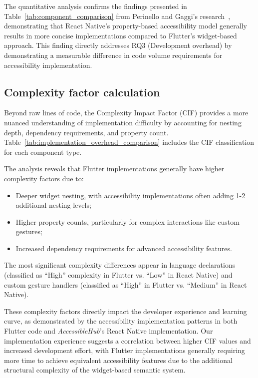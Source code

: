 {The quantitative analysis confirms the findings presented in Table~\ref{tab:component_comparison} from Perinello and Gaggi's research~\cite{perinello2024accessibility}, demonstrating that React Native's property-based accessibility model generally results in more concise implementations compared to Flutter's widget-based approach. This finding directly addresses RQ3 (Development overhead) by demonstrating a measurable difference in code volume requirements for accessibility implementation.

\subsection{Complexity factor calculation}
\label{subsec:complexity-calculation}

Beyond raw lines of code, the Complexity Impact Factor (CIF) provides a more nuanced understanding of implementation difficulty by accounting for nesting depth, dependency requirements, and property count. Table~\ref{tab:implementation_overhead_comparison} includes the CIF classification for each component type.

The analysis reveals that Flutter implementations generally have higher complexity factors due to:

\begin{itemize}
    \item Deeper widget nesting, with accessibility implementations often adding 1-2 additional nesting levels;
    \item Higher property counts, particularly for complex interactions like custom gestures;
    \item Increased dependency requirements for advanced accessibility features.
\end{itemize}

The most significant complexity differences appear in language declarations (classified as ``High'' complexity in Flutter vs. ``Low'' in React Native) and custom gesture handlers (classified as ``High'' in Flutter vs. ``Medium'' in React Native).

These complexity factors directly impact the developer experience and learning curve, as demonstrated by the accessibility implementation patterns in both Flutter code and \textit{AccessibleHub}'s React Native implementation. Our implementation experience suggests a correlation between higher CIF values and increased development effort, with Flutter implementations generally requiring more time to achieve equivalent accessibility features due to the additional structural complexity of the widget-based semantic system.

}
